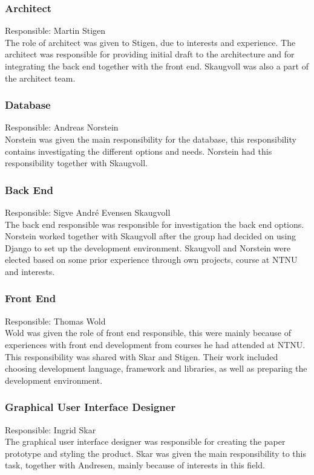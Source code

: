 \subsubsection{Architect}
Responsible: Martin Stigen \\
The role of architect was given to Stigen, due to interests and experience. The architect was responsible for providing initial draft to the architecture and for integrating the back end together with the front end. Skaugvoll was also a part of the architect team.

\subsubsection{Database}
Responsible: Andreas Norstein\\
Norstein was given the main responsibility for the database, this responsibility contains investigating the different options and needs. Norstein had this responsibility together with Skaugvoll.

\subsubsection{Back End}
Responsible: Sigve André Evensen Skaugvoll\\
The back end responsible was responsible for investigation the back end options. Norstein worked together with Skaugvoll after the group had decided on using Django to set up the development environment. Skaugvoll and Norstein were elected based on some prior experience through own projects, course at NTNU and interests.

\subsubsection{Front End}
Responsible: Thomas Wold\\
Wold was given the role of front end responsible, this were mainly because of experiences with front end development from courses he had attended at NTNU. This responsibility was shared with Skar and Stigen. Their work included choosing development language, framework and libraries, as well as preparing the development environment.

\subsubsection{Graphical User Interface Designer}
Responsible: Ingrid Skar\\
The graphical user interface designer was responsible for creating the paper prototype and styling the product. Skar was given the main responsibility to this task, together with Andresen, mainly because of interests in this field.

